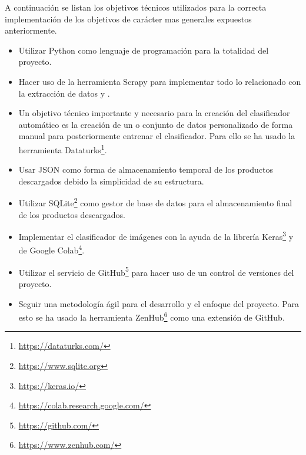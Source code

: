 A continuación se listan los objetivos técnicos utilizados para la correcta implementación de los objetivos de carácter mas generales expuestos anteriormente.

\begin{itemize}
	\item Utilizar Python como lenguaje de programación para la totalidad del proyecto.
	\item Hacer uso de la herramienta Scrapy para implementar todo lo relacionado con la extracción de datos y .
	\item Un objetivo técnico importante y necesario para la creación del clasificador automático es la creación de un  o conjunto de datos personalizado de forma manual para posteriormente entrenar el clasificador. Para ello se ha usado la herramienta Dataturks\footnote{\url{https://dataturks.com/}}.
	\item Usar JSON como forma de almacenamiento temporal de los productos descargados debido la simplicidad de su estructura.
	\item Utilizar SQLite\footnote{\url{https://www.sqlite.org}} como gestor de base de datos para el almacenamiento final de los productos descargados.
	\item Implementar el clasificador de imágenes con la ayuda de la librería Keras\footnote{\url{https://keras.io/}} y de Google Colab\footnote{\url{https://colab.research.google.com/}}.
	\item Utilizar el servicio de GitHub\footnote{\url{https://github.com/}} para hacer uso de un control de versiones del proyecto.
	\item Seguir una metodología ágil para el desarrollo y el enfoque del proyecto. Para esto se ha usado la herramienta ZenHub\footnote{\url{https://www.zenhub.com/}} como una extensión de GitHub.
\end{itemize}